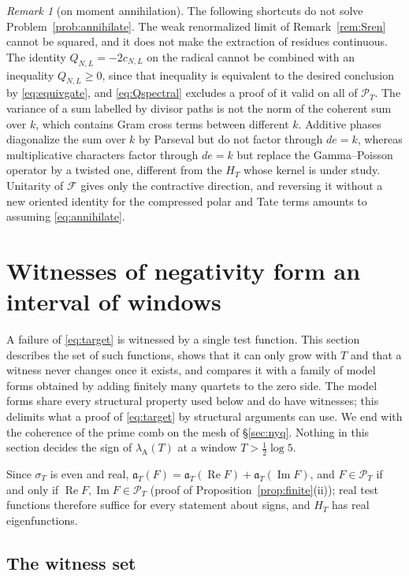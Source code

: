 \documentclass[11pt]{amsart}
\theoremstyle{definition}
\theoremstyle{remark}
\newtheorem{remark}[theorem]{Remark}
\newcommand{\Rel}{\operatorname{Re}}
\newcommand{\Iml}{\operatorname{Im}}
\newcommand{\PT}{\mathcal P_T}
\newcommand{\lamA}{\lambda_{\mathrm A}(T)}
\newcommand{\sT}{\sigma_T}
\begin{document}
\begin{remark}[on moment annihilation]\label{rem:returnremarks}
The following shortcuts do not solve Problem~\ref{prob:annihilate}. The weak renormalized limit of
Remark~\ref{rem:Sren} cannot be squared, and it does not make the extraction of residues continuous. The identity
$Q_{N,L}=-2c_{N,L}$ on the radical cannot be combined with an inequality $Q_{N,L}\ge0$, since that inequality is
equivalent to the desired conclusion by \eqref{eq:equivgate}, and \eqref{eq:Qspectral} excludes a proof of it valid on all
of $\PT$. The variance of a sum labelled by divisor paths is not the norm of the coherent sum over $k$, which contains
Gram cross terms between different $k$. Additive phases diagonalize the sum over $k$ by Parseval but do not factor
through $de=k$, whereas multiplicative characters factor through $de=k$ but replace the Gamma--Poisson operator by a
twisted one, different from the $H_T$ whose kernel is under study. Unitarity of $\mathscr F$ gives only the contractive
direction, and reversing it without a new oriented identity for the compressed polar and Tate terms amounts to
assuming \eqref{eq:annihilate}.
\end{remark}


\section{Witnesses of negativity form an interval of windows}\label{sec:wit}

A failure of \eqref{eq:target} is witnessed by a single test function. This section describes the set of such
functions, shows that it can only grow with $T$ and that a witness never changes once it exists, and compares it
with a family of model forms obtained by adding finitely many quartets to the zero side. The model forms share every
structural property used below and do have witnesses; this delimits what a proof of \eqref{eq:target} by structural
arguments can use. We end with the coherence of the prime comb on the mesh of \S\ref{sec:nyq}. Nothing in this section
decides the sign of $\lamA$ at a window $T>\frac12\log5$.

Since $\sT$ is even and real, $\mathfrak a_T(F)=\mathfrak a_T(\Rel F)+\mathfrak a_T(\Iml F)$, and $F\in\PT$ if and only if
$\Rel F,\Iml F\in\PT$ (proof of Proposition~\ref{prop:finite}(ii)); real test functions therefore suffice for every
statement about signs, and $H_T$ has real eigenfunctions.

\subsection{The witness set}
\end{document}
